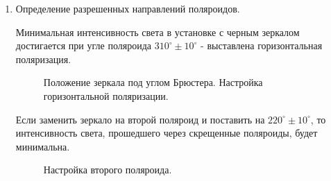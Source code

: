 \documentclass[a4paper,12pt]{article}
\theoremstyle{plain} %
\theoremstyle{definition} %
\theoremstyle{remark} %
\begin{document}
\begin{enumerate}
   \item Определение разрешенных направлений поляроидов.
   
   	Минимальная интенсивность света в установке с черным зеркалом достигается при угле поляроида $310^{\circ} \pm 10^{\circ}$ - выставлена горизонтальная поляризация.
   	
   	 \begin{figure}[h!]
   		\caption{Положение зеркала под углом Брюстера. Настройка горизонтальной поляризации.}
   	\end{figure}
   
   
   Если заменить зеркало на второй поляроид и поставить на $220^{\circ} \pm 10^{\circ}$, то интенсивность света, прошедшего через скрещенные поляроиды, будет минимальна.
	
	\begin{figure}[h!]
		\caption{Настройка второго поляроида.}
	\end{figure}
	

\end{enumerate}
\end{document}
